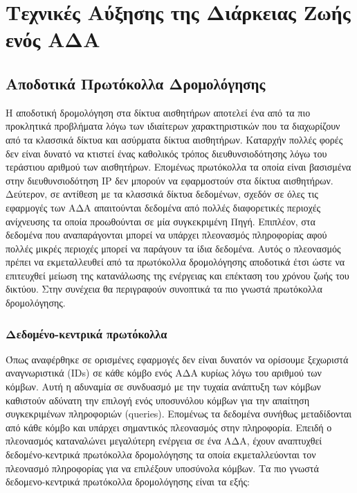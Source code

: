 
\chapter{Τεχνικές Αύξησης της Διάρκειας Ζωής ενός ΑΔΑ}\label{ch:energy_reduction}


\section{Αποδοτικά Πρωτόκολλα Δρομολόγησης}
Η αποδοτική δρομολόγηση στα δίκτυα αισθητήρων αποτελεί ένα από τα πιο προκλητικά προβλήματα λόγω των ιδιαίτερων χαρακτηριστικών που τα διαχωρίζουν από τα κλασσικά
δίκτυα και ασύρματα δίκτυα αισθητήρων.
Καταρχήν πολλές φορές δεν είναι δυνατό να κτιστεί ένας καθολικός τρόπος διευθυνσιοδότησης λόγω του τεράστιου αριθμού των αισθητήρων.
Επομένως πρωτόκολλα τα οποία είναι βασισμένα στην διευθυνσιοδότηση IP δεν μπορούν να εφαρμοστούν στα δίκτυα αισθητήρων.
Δεύτερον, σε αντίθεση με τα κλασσικά δίκτυα δεδομένων, σχεδόν σε όλες τις εφαρμογές των ΑΔΑ απαιτούνται δεδομένα από πολλές διαφορετικές περιοχές ανίχνευσης τα
οποία προωθούνται σε μία συγκεκριμένη Πηγή.
Επιπλέον, στα δεδομένα που αναπαράγονται μπορεί να υπάρχει πλεονασμός πληροφορίας αφού πολλές μικρές περιοχές μπορεί να παράγουν τα ίδια δεδομένα.
Αυτός ο πλεονασμός πρέπει να εκμεταλλευθεί από τα πρωτόκολλα δρομολόγησης αποδοτικά έτσι ώστε να επιτευχθεί μείωση της κατανάλωσης της ενέργειας και επέκταση του
χρόνου ζωής του δικτύου.
Στην συνέχεια θα περιγραφούν συνοπτικά τα πιο γνωστά πρωτόκολλα δρομολόγησης.


\subsection{Δεδομένο-κεντρικά πρωτόκολλα}
Όπως αναφέρθηκε σε ορισμένες εφαρμογές δεν είναι δυνατόν να ορίσουμε ξεχωριστά αναγνωριστικά (IDs) σε κάθε κόμβο ενός ΑΔΑ κυρίως λόγω του αριθμού των κόμβων.
Αυτή η αδυναμία σε συνδυασμό με την τυχαία ανάπτυξη των κόμβων καθιστούν αδύνατη την επιλογή ενός υποσυνόλου κόμβων για την απαίτηση
συγκεκριμένων πληροφοριών (queries).
Επομένως τα δεδομένα συνήθως μεταδίδονται από κάθε κόμβο και υπάρχει σημαντικός πλεονασμός στην πληροφορία.
Επειδή ο πλεονασμός καταναλώνει μεγαλύτερη ενέργεια σε ένα ΑΔΑ, έχουν αναπτυχθεί δεδομένο-κεντρικά πρωτόκολλα δρομολόγησης τα οποία εκμεταλλεύονται τον πλεονασμό
πληροφορίας για να επιλέξουν υποσύνολα κόμβων. Τα πιο γνωστά δεδομενο-κεντρικά πρωτόκολλα δρομολόγησης είναι τα εξής:

